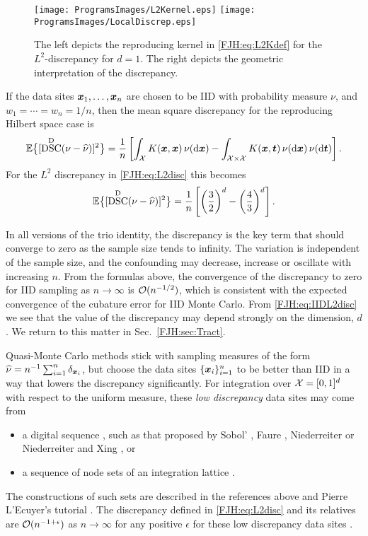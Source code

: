 \documentclass[graybox,footinfo]{svmult}
\DeclareMathOperator{\disc}{DSC}
\begin{document}
\begin{figure}
	\centering
	\texttt{[image: ProgramsImages/L2Kernel.eps]}\qquad
	\texttt{[image: ProgramsImages/LocalDiscrep.eps]}
	\caption{The left depicts the reproducing kernel in \eqref{FJH:eq:L2Kdef} for the 
	$L^2$-discrepancy 
	for $d=1$.  The right depicts the geometric interpretation of the discrepancy.
	\label{FJH:fig:L2ker}}
\end{figure}

If the data sites  ${\boldsymbol{x}}_{1}, \ldots, {\boldsymbol{x}}_{n}$ are chosen to be IID with probability measure 
$\nu$, and $w_1 = \cdots = w_n = 1/n$, then 
the mean square discrepancy for 
the reproducing Hilbert space case is
\begin{equation*}
\bbE \bigl\{[\disc^{\Dt}(\nu - \hnu)]^2 \bigr \}  = \frac 1 n \left [ \int_{\cx} K(\bsx,\bsx) \, 
\nu(\D 
\bsx) - 
\int_{\cx \times \cx} K(\bsx,\bst) \, \nu(\D \bsx) \, \nu (\D \bst) \right ].
\end{equation*}
For the $L^2$ discrepancy in \eqref{FJH:eq:L2disc} this becomes 
\begin{equation} \label{FJH:eq:IIDL2disc}
\bbE \bigl\{[\disc^{\Dt}(\nu - \hnu)]^2 \bigr \} = \frac 1 n \left [ \left(\frac 32\right)^d - 
\left(\frac 43\right)^d \right ].
\end{equation}

In all versions of the trio identity, the discrepancy is the key term that should converge to 
zero as the sample size tends to infinity.  The variation is independent of the sample 
size, and the confounding may decrease, increase or oscillate with increasing $n$.  From 
the formulas above, the convergence of the discrepancy to zero for IID sampling as $n 
\to 
\infty$ is  $\mathcal{O}(n^{-1/2})$, which is consistent with the expected convergence of the 
cubature error for IID Monte Carlo.  From \eqref{FJH:eq:IIDL2disc} we see that the 
value of the discrepancy may depend strongly on the dimension, $d$.  We return 
to this matter in Sec.\  \ref{FJH:sec:Tract}.

Quasi-Monte Carlo methods stick with sampling measures of the form  $\widehat{\nu} = 
n^{-1}\sum_{i=1}^n \delta_{{\boldsymbol{x}}_i}$, but choose the data sites $\{{\boldsymbol{x}}_i\}_{i=1}^n$ to be 
better than IID in a way that lowers the discrepancy significantly.  For 
integration over $\mathcal{X} = [0,1]^d$ with 
respect to the uniform measure, these \emph{low discrepancy} data sites may come from
\begin{itemize} 
\item a digital sequence \cite{DicPil10a}, such as that proposed by Sobol' \cite{}, Faure 
\cite{}, 
Niederreiter \cite{} or Niederreiter and Xing \cite{}, or 
\item a sequence of node sets of an integration lattice \cite{SloJoe94}.  
\end{itemize}
The 
constructions of such sets are described in the references above and Pierre L'Ecuyer's 
tutorial 
\cite{}.  The discrepancy defined in \eqref{FJH:eq:L2disc} and its relatives are 
$\mathcal{O}(n^{-1+\epsilon})$ as $n \to \infty$ for any positive $\epsilon$ for these low 
discrepancy data sites \cite{bibid}.  
\end{document}
